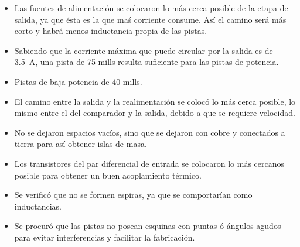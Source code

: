 \begin{itemize}
	\item Las fuentes de alimentación se colocaron lo más cerca posible de la etapa de salida, ya que ésta es la que maś corriente consume. Así el camino será más corto y habrá menos inductancia propia de las pistas.
	\item Sabiendo que la corriente máxima que puede circular por la salida es de \SI{3.5}{\ampere}, una pista de 75 mills resulta suficiente para las pistas de potencia.
	\item Pistas de baja potencia de 40 mills.
	\item El camino entre la salida y la realimentación se colocó lo más cerca posible, lo mismo entre el del comparador y la salida, debido a que se requiere velocidad. 
	\item No se dejaron espacios vacíos, sino que se dejaron con cobre y conectados a tierra para así obtener islas de masa.
	\item Los transistores del par diferencial de entrada se colocaron lo más cercanos posible para obtener un buen acoplamiento térmico.
	\item Se verificó que no se formen espiras, ya que se comportarían como inductancias.
	\item Se procuró que las pistas no posean esquinas con puntas ó ángulos agudos para evitar interferencias y facilitar la fabricación.

\end{itemize}
